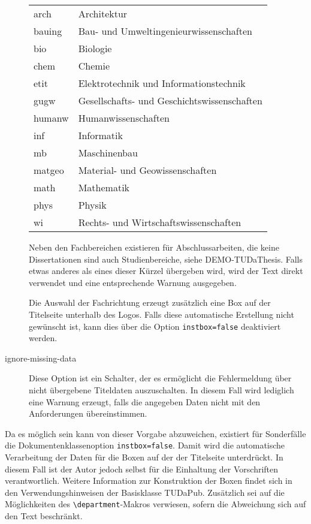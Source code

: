 \documentclass[
	german,%
	accentcolor=9c,%
	ruledheaders=chapter,%
	class=book,%
	thesis={%
			type=dr,
			dr=rernat
		},
	fontsize=11pt,%
	parskip=half-,%
	custommargins=true,%
	marginpar=false,%
]{tudapub}
\newcommand*{\code}[1]{\texttt{#1}}
\begin{document}
\begin{description}
	      \begin{tabular}{@{}l@{${}\to{}$}l@{}}
		      arch  & Architektur\\
		      bauing& Bau- und Umweltingenieurwissenschaften\\
		      bio   &Biologie\\
		      chem  &Chemie\\
		      etit  &Elektrotechnik und Informationstechnik\\
		      gugw  &Gesellschafts- und Geschichtswissenschaften\\
		      humanw&Humanwissenschaften\\
		      inf   &Informatik\\
		      mb    &Maschinenbau\\
		      matgeo&Material- und Geowissenschaften\\
		      math  &Mathematik\\
		      phys  &Physik\\
		      wi    &Rechts- und Wirtschaftswissenschaften
	      \end{tabular}

	      Neben den Fachbereichen existieren für Abschlussarbeiten, die keine Dissertationen sind auch Studienbereiche, siehe DEMO-TUDaThesis.
	      Falls etwas anderes als eines dieser Kürzel übergeben wird, wird der Text direkt verwendet und eine entsprechende Warnung ausgegeben.

	      Die Auswahl der Fachrichtung erzeugt zusätzlich eine Box auf der Titelseite unterhalb des Logos. Falls diese automatische Erstellung nicht gewünscht ist, kann dies über die Option \code{instbox=false} deaktiviert werden.
	\item[ignore-missing-data] Diese Option ist ein Schalter, der es ermöglicht die Fehlermeldung über nicht übergebene Titeldaten auszuschalten. In diesem Fall wird lediglich eine Warnung erzeugt, falls die angegeben Daten nicht mit den Anforderungen übereinstimmen.
\end{description}

Da es möglich sein kann von dieser Vorgabe abzuweichen, existiert für Sonderfälle die Dokumentenklassenoption \code{instbox=false}. Damit wird die automatische Verarbeitung der Daten für die Boxen auf der der Titelseite unterdrückt. In diesem Fall ist der Autor jedoch selbst für die Einhaltung der Vorschriften verantwortlich. Weitere Information zur Konstruktion der Boxen findet sich in den Verwendungshinweisen der Basisklasse TUDaPub. Zusätzlich sei auf die Möglichkeiten des \code{\textbackslash{}department}-Makros verwiesen, sofern die Abweichung sich auf den Text beschränkt.
\end{document}
